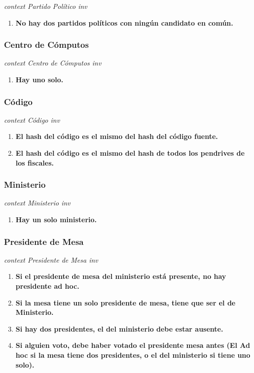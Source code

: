 \textit{context Partido Pol\'itico
inv}

\begin{enumerate}
\item \textbf{No hay dos partidos políticos con ningún candidato en común.}
\end{enumerate}

\subsubsection*{Centro de C\'omputos}

\textit{context Centro de C\'omputos
inv}

\begin{enumerate}
\item \textbf{Hay uno solo.}
\end{enumerate}

\subsubsection*{C\'odigo}

\textit{context C\'odigo
inv}

\begin{enumerate}
\item \textbf{El hash del código es el mismo del hash del código fuente. }  
\item \textbf{El hash del código es el mismo del hash de todos los pendrives de los fiscales.}   
\end{enumerate}  

\subsubsection*{Ministerio}

\textit{context Ministerio
inv}

\begin{enumerate}
\item \textbf{Hay un solo ministerio.}
\end{enumerate}

\subsubsection*{Presidente de Mesa}

\textit{context Presidente de Mesa
inv}

\begin{enumerate}
\item \textbf{Si el presidente de mesa del ministerio está presente, no hay presidente ad hoc.}
\item \textbf{Si la mesa tiene un solo presidente de mesa, tiene que ser el de Ministerio.}
\item \textbf{Si hay dos presidentes, el del ministerio debe estar ausente.}
\item \textbf{Si alguien voto, debe haber votado el presidente mesa antes (El Ad hoc si la mesa tiene dos presidentes, o el del ministerio si tiene uno solo).}
\end{enumerate}

